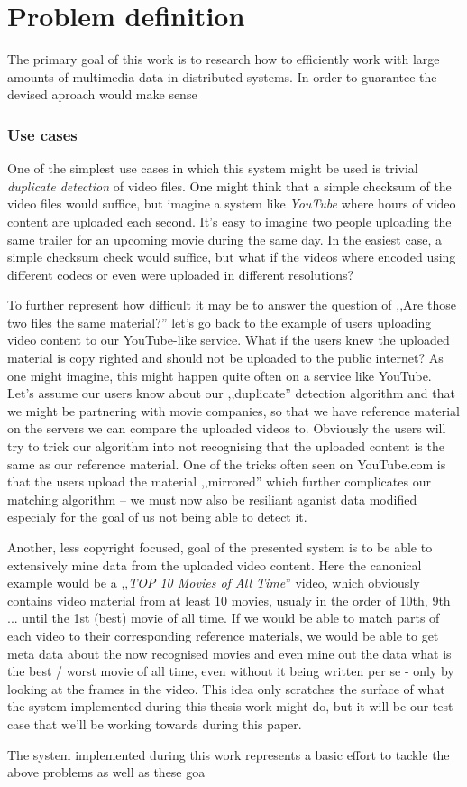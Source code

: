 \chapter{Problem definition}
The primary goal of this work is to research how to efficiently work with large amounts of multimedia data in distributed systems. 
In order to guarantee the devised aproach would make sense

\subsection{Use cases}

One of the simplest use cases in which this system might be used is trivial \textit{duplicate detection} of video files.
One might think that a simple checksum of the video files would suffice, but imagine a system like \textit{YouTube} where hours of video content are uploaded 
each second. It's easy to imagine two people uploading the same trailer for an upcoming movie during the same day. In the easiest case, a simple checksum
check would suffice, but what if the videos where encoded using different codecs or even were uploaded in different resolutions?

To further represent how difficult it may be to answer the question of ,,Are those two files the same material?'' let's go back to the example of users
uploading video content to our YouTube-like service. What if the users knew the uploaded material is copy righted and should not be uploaded to the public
internet? As one might imagine, this might happen quite often on a service like YouTube. Let's assume our users know about our ,,duplicate'' detection
algorithm and that we might be partnering with movie companies, so that we have reference material on the servers we can compare the uploaded videos to.
Obviously the users will try to trick our algorithm into not recognising that the uploaded content is the same as our reference material. One of the tricks
often seen on YouTube.com is that the users upload the material ,,mirrored'' which further complicates our matching algorithm -- we must now also be 
resiliant aganist data modified especialy for the goal of us not being able to detect it.

Another, less copyright focused, goal of the presented system is to be able to extensively mine data from the uploaded video content.
Here the canonical example would be a ,,\textit{TOP 10 Movies of All Time}'' video, which obviously contains video material from at least 10 movies,
usualy in the order of 10th, 9th ... until the 1st (best) movie of all time. If we would be able to match parts of each video to their corresponding 
reference materials, we would be able to get meta data about the now recognised movies and even mine out the data what is the best / worst movie of all time,
even without it being written per se - only by looking at the frames in the video. This idea only scratches the surface of what the system implemented during
this thesis work might do, but it will be our test case that we'll be working towards during this paper.

The system implemented during this work represents a basic effort to tackle the above problems as well as these goa